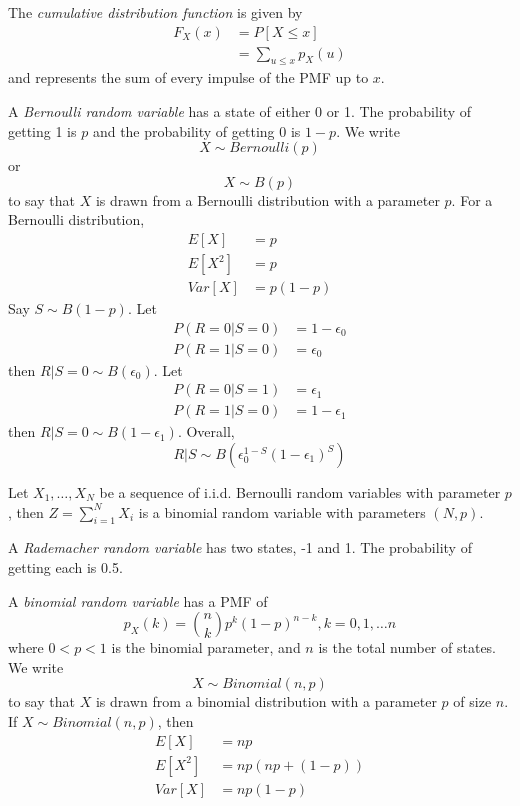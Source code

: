 The \emph{cumulative distribution function} is given by
\begin{align}
    F_X(x) & = P\left[X \leq x\right] \\
           & = \sum_{u \leq x} p_X(u)
\end{align}
and represents the sum of every impulse
of the PMF up to $x$.

A \emph{Bernoulli random variable} has a state
of either 0 or 1. The probability of getting 1 is $p$ and
the probability of getting 0 is $1 - p$. We write
\begin{equation}
    X \sim Bernoulli(p)
\end{equation}
or
\begin{equation}
    X \sim B(p)
\end{equation}
to say that $X$ is drawn from a Bernoulli distribution
with a parameter $p$. For a Bernoulli distribution,
\begin{align}
    E[X]   & = p        \\
    E[X^2] & = p        \\
    Var[X] & = p(1 - p)
\end{align}
Say $S \sim B(1-p)$.
Let
\begin{align}
    P(R=0|S=0) & = 1 - \epsilon_0 \\
    P(R=1|S=0) & = \epsilon_0
\end{align}
then $R|S=0 \sim B(\epsilon_0)$.
Let
\begin{align}
    P(R=0|S=1) & = \epsilon_1     \\
    P(R=1|S=0) & = 1 - \epsilon_1
\end{align}
then $R|S=0 \sim B(1 - \epsilon_1)$.
Overall,
\begin{equation}
    R|S \sim B(\epsilon_0^{1-S}(1-\epsilon_1)^S)
\end{equation}

Let $X_1, \dots, X_N$ be a sequence of i.i.d. Bernoulli
random variables with parameter $p$, then $Z = \sum_{i=1}^{N}X_i$
is a binomial random variable with parameters $(N, p)$.

A \emph{Rademacher random variable} has two states, -1 and 1.
The probability of getting each is 0.5.

A \emph{binomial random variable} has a PMF of
\begin{equation}
    p_X(k) = {n\choose k} p^k (1 - p)^{n - k}, k = 0, 1, \dots n
\end{equation}
where $0 < p < 1$ is the binomial parameter, and $n$ is the total
number of states. We write
\begin{equation}
    X \sim Binomial(n, p)
\end{equation}
to say that $X$ is drawn from a binomial distribution with a
parameter $p$ of size $n$.
If $X \sim Binomial(n, p)$, then
\begin{align}
    E[X]   & = np               \\
    E[X^2] & = np(np + (1 - p)) \\
    Var[X] & = np(1 - p)
\end{align}

